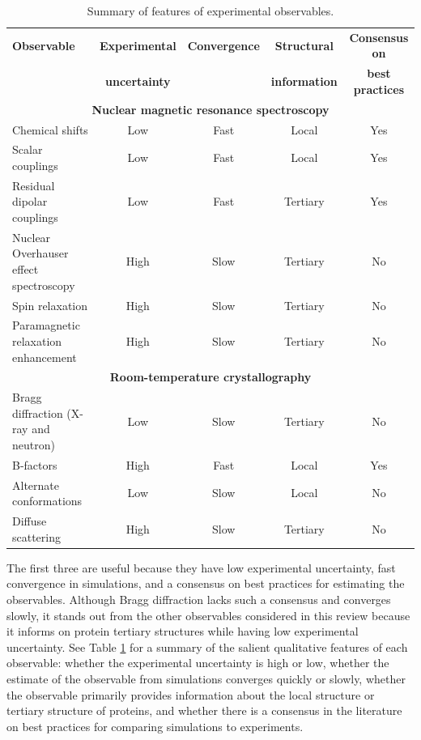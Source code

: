 \documentclass[9pt,review,pubversion]{livecoms}
\begin{document}
\begin{table}[!ht]
\centering
\caption{Summary of features of experimental observables.}
\begin{tabular}{p{} c c c c}
\toprule
{\bf Observable} & {\bf Experimental} & \bf Convergence & \bf Structural & \bf Consensus on \\
& \bf uncertainty & & \bf information & \bf best practices \\
\midrule
\multicolumn{5}{c}{\bf Nuclear magnetic resonance spectroscopy} \\
\midrule
Chemical shifts & Low & Fast & Local & Yes \\
Scalar couplings & Low & Fast & Local & Yes \\
Residual dipolar couplings & Low & Fast & Tertiary & Yes \\
Nuclear Overhauser effect spectroscopy & High & Slow & Tertiary & No \\
Spin relaxation & High & Slow & Tertiary & No \\
Paramagnetic relaxation enhancement & High & Slow & Tertiary & No \\
\midrule
\multicolumn{5}{c}{\bf Room-temperature crystallography} \\
\midrule
Bragg diffraction (X-ray and neutron) & Low & Slow & Tertiary & No \\
B-factors & High & Fast & Local & Yes \\
Alternate conformations & Low & Slow & Local & No \\
Diffuse scattering & High & Slow & Tertiary & No \\
\bottomrule
\end{tabular}
\label{tab:observables}
\end{table}

\noindent The first three are useful because they have low experimental uncertainty, fast convergence in simulations, and a consensus on best practices for estimating the observables.
Although Bragg diffraction lacks such a consensus and converges slowly, it stands out from the other observables considered in this review because it informs on protein tertiary structures while having low experimental uncertainty.
See Table \ref{tab:observables} for a summary of the salient qualitative features of each observable: whether the experimental uncertainty is high or low, whether the estimate of the observable from simulations converges quickly or slowly, whether the observable primarily provides information about the local structure or tertiary structure of proteins, and whether there is a consensus in the literature on best practices for comparing simulations to experiments.
\end{document}
